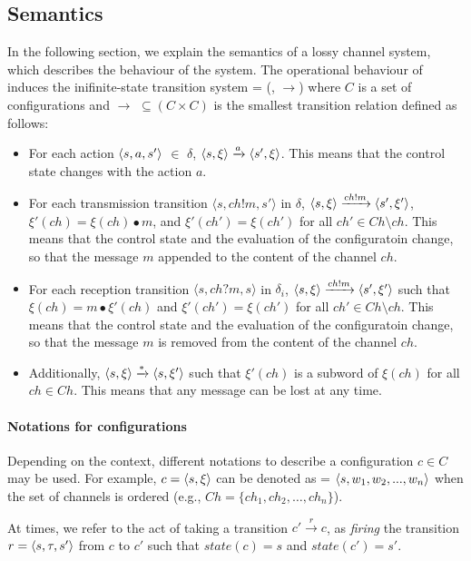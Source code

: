 \subsection{Semantics}
\label{LTS}
In the following section, we explain the semantics of a lossy channel system, which describes the behaviour of the system. The operational behaviour of  induces the inifinite-state transition system  = (, $\rightarrow$) where $C$ is a set of configurations and $\rightarrow$ $\subseteq (C \times C)$ is the smallest transition relation defined as follows:
  \begin{itemize}
    \item For each action $\langle s, a, s'\rangle$ $\in$ $\delta$, $\langle s, \xi\rangle \xrightarrow{a} \langle s', \xi\rangle$. This means that the control state changes with the action $a$.
    \item For each transmission transition $\langle s, ch!m, s' \rangle$ in $\delta$, $\langle s, \xi\rangle \xrightarrow{ch!m} \langle s', \xi'\rangle$, $\xi'(ch) = \xi(ch)\bullet m$, and $\xi'(ch')=\xi(ch')$ for all $ch' \in Ch \setminus ch$. This means that the control state and the evaluation of the configuratoin change, so that the message $m$ appended to the content of the channel $ch$.
    \item For each reception transition $\langle s, ch?m, s \rangle$ in $\delta_i$, $\langle s, \xi\rangle \xrightarrow{ch!m} \langle s', \xi'\rangle$ such that $\xi(ch)=m \bullet \xi'(ch) $ and $\xi'(ch')=\xi(ch')$ for all $ch' \in Ch \setminus ch$. This means that the control state and the evaluation of the configuratoin change, so that the message $m$ is removed from the content of the channel $ch$.
    \item Additionally, $\langle s, \xi\rangle \xrightarrow{*} \langle s, \xi'\rangle$ such that $\xi'(ch)$ is a subword of $\xi(ch)$ for all $ch \in Ch$. This means that any message can be lost at any time.
  \end{itemize}

\paragraph{Notations for configurations}
Depending on the context, different notations to describe a configuration $c\in C$ may be used. For example, $c = \langle s, \xi\rangle$ can be denoted as  = $\langle s, w_1, w_2, ..., w_n\rangle$ when the set of channels is ordered (e.g., $Ch=\{ch_1,ch_2, \ldots,ch_n\}$).

At times, we refer to the act of taking a transition $c' \xrightarrow{r} c$, as \emph{firing} the transition $r=\langle s,\tau,s'\rangle$ from $c$ to $c'$ such that $state(c)=s$ and $state(c')=s'$.

